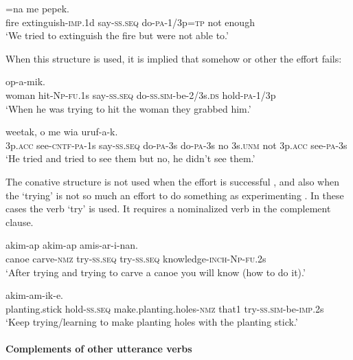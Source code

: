 \ea%
\label{ex:8:x373}
=na  me  pepek.\\
fire  extinguish-\textsc{imp}.1d say-\textsc{ss}.\textsc{seq} do-\textsc{pa}-1/3p=\textsc{tp} not enough\\
\glt`We tried to extinguish the fire but were not able to.'
\z


When this structure is used, it is implied that somehow or other the effort fails:

\ea%
\label{ex:8:x374}
  op-a-mik.\\
woman hit-\textsc{Np}-\textsc{fu}.1s say-\textsc{ss}.\textsc{seq} do-\textsc{ss}.\textsc{sim}-be-2/3s.\textsc{ds} hold-\textsc{pa}-1/3p\\
\glt`When he was trying to hit the woman they grabbed him.'
\z


\ea%
\label{ex:8:x1606}
 weetak, o me wia  uruf-a-k.\\
3p.\textsc{acc} see-\textsc{cntf}-\textsc{pa}-1s say-\textsc{ss}.\textsc{seq} do-\textsc{pa}-3s do-\textsc{pa}-3s no 3s.\textsc{unm} not  3p.\textsc{acc} see-\textsc{pa}-3s\\
\glt`He tried and tried to see them but no, he didn't see them.'
\z


The conative structure is not used when the effort is successful , and also when the `trying' is not so much an effort to do something as experimenting .  In these cases the verb  `try' is used. It requires a nominalized verb in the complement clause. 

\ea%
\label{ex:8:x375}
  akim-ap  akim-ap amis-ar-i-nan.\\
canoe  carve-\textsc{nmz} try-\textsc{ss}.\textsc{seq} try-\textsc{ss}.\textsc{seq} knowledge-\textsc{inch}-\textsc{Np}-\textsc{fu}.2s\\
\glt`After trying and trying to carve a canoe you will know (how to do it).'
\z


\ea%
\label{ex:8:x376}
  akim-am-ik-e.\\
planting.stick hold-\textsc{ss}.\textsc{seq} make.planting.holes-\textsc{nmz} that1 try-\textsc{ss}.\textsc{sim}-be-\textsc{imp}.2s\\
\glt`Keep trying/learning to make planting holes with the planting stick.'
\z


\paragraph[Complements of other utterance verbs ]{Complements of other utterance verbs} 

